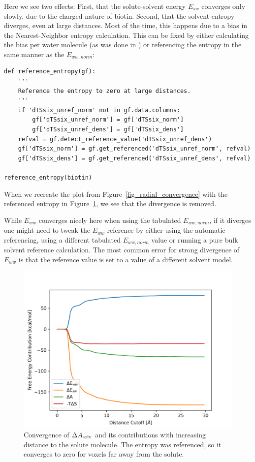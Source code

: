 \documentclass[9pt,tutorial]{livecoms}
\newcommand{\dasolv}{\Delta A_\textup{solv}}
\begin{document}
Here we see two effects: First, that the solute-solvent energy $E_{sw}$ converges only slowly, due to the charged nature of biotin.
Second, that the solvent entropy diverges, even at large distances.
Most of the time, this happens due to a bias in the Nearest-Neighbor entropy calculation\cite{Chen2021,Huggins2014-entropy}.
This can be fixed by either calculating the bias per water molecule (as was done in \cite{Chen2021}) or referencing the entropy in the same manner as the $E_{ww, norm}$:
\begin{lstlisting}[style=python]
	def reference_entropy(gf):
	'''
	Reference the entropy to zero at large distances.
	'''
    if 'dTSsix_unref_norm' not in gf.data.columns:
        gf['dTSsix_unref_norm'] = gf['dTSsix_norm']
        gf['dTSsix_unref_dens'] = gf['dTSsix_dens']
    refval = gf.detect_reference_value('dTSsix_unref_dens')
    gf['dTSsix_norm'] = gf.get_referenced('dTSsix_unref_norm', refval)
    gf['dTSsix_dens'] = gf.get_referenced('dTSsix_unref_dens', refval)

reference_entropy(biotin)
\end{lstlisting}
When we recreate the plot from Figure~\ref{fig_radial_convergence} with the referenced entropy in Figure~\ref{fig_radial_convergence_ref}, we see that the divergence is removed.

While $E_{ww}$ converges nicely here when using the tabulated $E_{ww, norm}$, if it diverges one might need to tweak the $E_{ww}$ reference by either using the automatic referencing, using a different tabulated $E_{ww, norm}$ value or running a pure bulk solvent reference calculation.
The most common error for strong divergence of $E_{ww}$ is that the reference value is set to a value of a different solvent model.

\begin{figure}
	\centering
	\includegraphics[width=0.8\linewidth]{figures/biotin-contributions_ref.png}
	\caption{Convergence of $\dasolv$ and its contributions with increasing distance to the solute molecule. The entropy was referenced, so it converges to zero for voxels far away from the solute.}\label{fig_radial_convergence_ref}
\end{figure}
\end{document}
